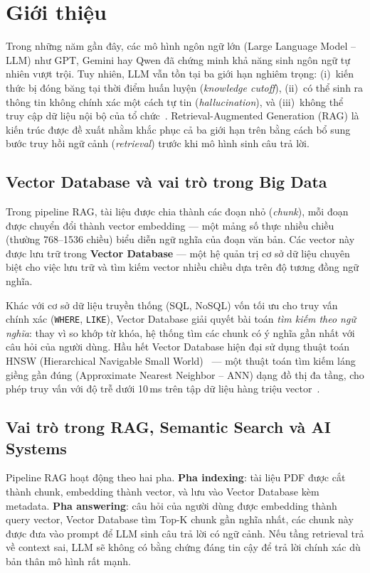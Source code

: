 \section{Giới thiệu}
\label{sec:introduction}

Trong những năm gần đây, các mô hình ngôn ngữ lớn (Large Language Model -- LLM) như GPT, Gemini hay Qwen đã chứng minh khả năng sinh ngôn ngữ tự nhiên vượt trội. Tuy nhiên, LLM vẫn tồn tại ba giới hạn nghiêm trọng: (i)~kiến thức bị đóng băng tại thời điểm huấn luyện (\textit{knowledge cutoff}), (ii)~có thể sinh ra thông tin không chính xác một cách tự tin (\textit{hallucination}), và (iii)~không thể truy cập dữ liệu nội bộ của tổ chức~\cite{lewis2020rag}. Retrieval-Augmented Generation (RAG) là kiến trúc được đề xuất nhằm khắc phục cả ba giới hạn trên bằng cách bổ sung bước truy hồi ngữ cảnh (\textit{retrieval}) trước khi mô hình sinh câu trả lời.

\subsection{Vector Database và vai trò trong Big Data}

Trong pipeline RAG, tài liệu được chia thành các đoạn nhỏ (\textit{chunk}), mỗi đoạn được chuyển đổi thành vector embedding --- một mảng số thực nhiều chiều (thường 768--1536 chiều) biểu diễn ngữ nghĩa của đoạn văn bản. Các vector này được lưu trữ trong \textbf{Vector Database} --- một hệ quản trị cơ sở dữ liệu chuyên biệt cho việc lưu trữ và tìm kiếm vector nhiều chiều dựa trên độ tương đồng ngữ nghĩa.

Khác với cơ sở dữ liệu truyền thống (SQL, NoSQL) vốn tối ưu cho truy vấn chính xác (\texttt{WHERE}, \texttt{LIKE}), Vector Database giải quyết bài toán \textit{tìm kiếm theo ngữ nghĩa}: thay vì so khớp từ khóa, hệ thống tìm các chunk có ý nghĩa gần nhất với câu hỏi của người dùng. Hầu hết Vector Database hiện đại sử dụng thuật toán HNSW (Hierarchical Navigable Small World)~\cite{malkov2020hnsw} --- một thuật toán tìm kiếm láng giềng gần đúng (Approximate Nearest Neighbor -- ANN) dạng đồ thị đa tầng, cho phép truy vấn với độ trễ dưới 10\,ms trên tập dữ liệu hàng triệu vector~\cite{annbenchmarks}.

\subsection{Vai trò trong RAG, Semantic Search và AI Systems}

Pipeline RAG hoạt động theo hai pha. \textbf{Pha indexing}: tài liệu PDF được cắt thành chunk, embedding thành vector, và lưu vào Vector Database kèm metadata. \textbf{Pha answering}: câu hỏi của người dùng được embedding thành query vector, Vector Database tìm Top-K chunk gần nghĩa nhất, các chunk này được đưa vào prompt để LLM sinh câu trả lời có ngữ cảnh. Nếu tầng retrieval trả về context sai, LLM sẽ không có bằng chứng đáng tin cậy để trả lời chính xác dù bản thân mô hình rất mạnh.

